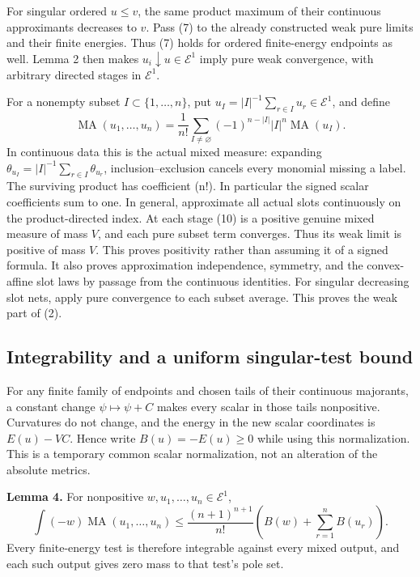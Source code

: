 \documentclass[
]{article}
\begin{document}
For singular ordered \(u\leq v\), the same product maximum of their
continuous approximants decreases to \(v\). Pass (7) to the already
constructed weak pure limits and their finite energies. Thus (7) holds
for ordered finite-energy endpoints as well. Lemma 2 then makes
\(u_i\downarrow u\in\mathcal E^1\) imply pure weak convergence, with
arbitrary directed stages in \(\mathcal E^1\).

For a nonempty subset \(I\subset\{1,\ldots,n\}\), put
\(u_I=|I|^{-1}\sum_{r\in I}u_r\in\mathcal E^1\), and define \[
\operatorname{MA}(u_1,\ldots,u_n)
=\frac1{n!}\sum_{I\ne\varnothing}(-1)^{n-|I|}|I|^n\operatorname{MA}(u_I).
\tag{10}
\] In continuous data this is the actual mixed measure: expanding
\(\theta_{u_I}=|I|^{-1}\sum_{r\in I}\theta_{u_r}\), inclusion--exclusion
cancels every monomial missing a label. The surviving product has
coefficient (n!). In particular the signed scalar coefficients sum to
one. In general, approximate all actual slots continuously on the
product-directed index. At each stage (10) is a positive genuine mixed
measure of mass \(V\), and each pure subset term converges. Thus its
weak limit is positive of mass \(V\). This proves positivity rather than
assuming it of a signed formula. It also proves approximation
independence, symmetry, and the convex-affine slot laws by passage from
the continuous identities. For singular decreasing slot nets, apply pure
convergence to each subset average. This proves the weak part of (2).

\subsection{Integrability and a uniform singular-test
bound}\label{integrability-and-a-uniform-singular-test-bound}

For any finite family of endpoints and chosen tails of their continuous
majorants, a constant change \(\psi\mapsto\psi+C\) makes every scalar in
those tails nonpositive. Curvatures do not change, and the energy in the
new scalar coordinates is \(E(u)-VC\). Hence write \(B(u)=-E(u)\geq0\)
while using this normalization. This is a temporary common scalar
normalization, not an alteration of the absolute metrics.

\textbf{Lemma 4.} For nonpositive \(w,u_1,\ldots,u_n\in\mathcal E^1\),
\[
\int(-w)\operatorname{MA}(u_1,\ldots,u_n)
\leq\frac{(n+1)^{n+1}}{n!}\left(B(w)+\sum_{r=1}^nB(u_r)\right).
\tag{11}
\] Every finite-energy test is therefore integrable against every mixed
output, and each such output gives zero mass to that test's pole set.
\end{document}

